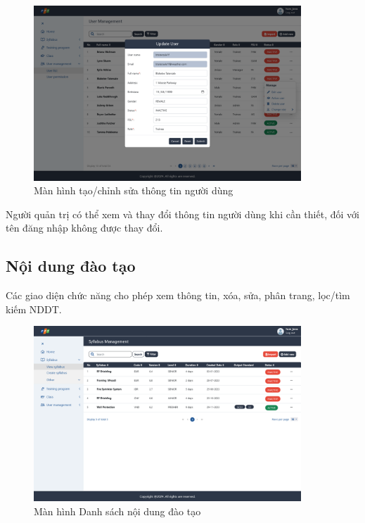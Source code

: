 \documentclass[report.tex]{subfiles}
\begin{document}
\begin{figure}[!htb]
{\centering
\includegraphics[width=380px]{../meta/ui.user-admin-update.png}
\caption{Màn hình tạo/chỉnh sửa thông tin người dùng}
\par
}
\end{figure}
\FloatBarrier

Người quản trị có thể xem và thay đổi thông tin người dùng khi cần thiết,
đối với tên đăng nhập không được thay đổi.

\subsection{Nội dung đào tạo}

Các giao diện chức năng cho phép xem thông tin, xóa, sửa, phân trang, lọc/tìm kiếm
NDDT.

\begin{figure}[!htb]
{\centering
\includegraphics[width=380px]{../meta/ui.syllabus-list.png}
\caption{Màn hình Danh sách nội dung đào tạo}
\par
}
\end{figure}
\FloatBarrier
\end{document}
